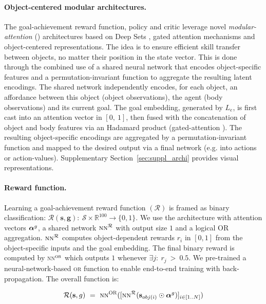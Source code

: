 
\paragraph{Object-centered modular architectures.} The goal-achievement reward function, policy and critic leverage novel \textit{modular-attention} (\MA) architectures based on Deep Sets \cite{deepset}, gated attention mechanisms \cite{chaplot2017gatedattention} and object-centered representations. The idea is to ensure efficient skill transfer between objects, no matter their position in the state vector. This is done through the combined use of a shared neural network that encodes object-specific features and a permutation-invariant function to aggregate the resulting latent encodings. The shared network independently encodes, for each object, an affordance between this object (object observations), the agent (body observations) and its current goal. The goal embedding, generated by $L_e$, is first cast into an attention vector in $[0,~1]$, then fused with the concatenation of object and body features via an Hadamard product (gated-attention \cite{chaplot2017gatedattention}). The resulting object-specific encodings are aggregated by a permutation-invariant function and mapped to the desired output via a final network (e.g. into actions or action-values). Supplementary Section~\ref{sec:suppl_archi} provides visual representations.

\paragraph{Reward function.} Learning a goal-achievement reward function $(\mathcal{R})$ is framed as binary classification: $\mathcal{R}(\mathbf{s}, \mathbf{g}):~\mathcal{S} \times \mathbb{R}^{100} \to \{0, 1\}$. We use the \MA architecture with attention vectors $\boldsymbol{\alpha}^g$, a shared network $\textsc{nn}^\mathcal{R}$ with output size $1$ and a logical OR aggregation. $\textsc{nn}^\mathcal{R}$ computes object-dependent rewards $r_{i}$ in $[0,1]$ from the object-specific inputs and the goal embedding. The final binary reward is computed by \textsc{nn}$^\textsc{or}$ which outputs $1$ whenever $ \exists j:~r_{j}~>~0.5$. We pre-trained a neural-network-based \textsc{or} function to enable end-to-end training with back-propagation. The overall function is:

\begin{equation*}
   \mathcal{R}(\mathbf{s}, g)~=~\textsc{nn}^\textsc{OR}([\textsc{nn}^\mathcal{R}(\mathbf{s}_{obj(i)} \odot \boldsymbol{\alpha}^g)]_{i\in[1..N]})
\end{equation*}


